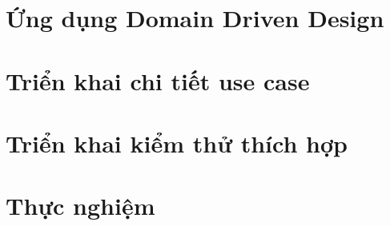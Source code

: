 \section{Ứng dụng Domain Driven Design}

\section{Triển khai chi tiết use case}

\section{Triển khai kiểm thử thích hợp}

\section{Thực nghiệm}
